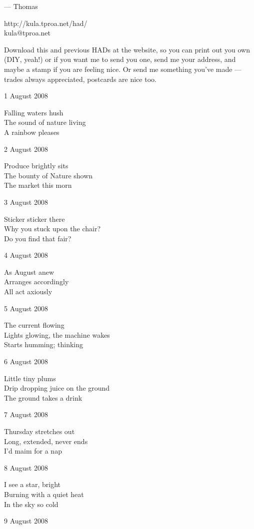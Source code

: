 \documentclass[12pt]{article}
\begin{document}
--- Thomas

http://kula.tproa.net/had/ \\
kula@tproa.net

Download this and previous HADs at the website, so you can
print out you own (DIY, yeah!) or if you want me to send
you one, send me your address, and maybe a stamp if you
are feeling nice. Or send me something you've made ---
trades always appreciated, postcards are nice too.


1 August 2008

Falling waters hush \\
The sound of nature living \\
A rainbow pleases

2 August 2008

Produce brightly sits \\
The bounty of Nature shown \\
The market this morn

\newpage

3 August 2008

Sticker sticker there \\
Why you stuck upon the chair? \\
Do you find that fair?

4 August 2008

As August anew \\
Arranges accordingly \\
All act axiously

5 August 2008

The current flowing \\
Lights glowing, the machine wakes \\
Starts humming; thinking

6 August 2008

Little tiny plums \\
Drip dropping juice on the ground \\
The ground takes a drink

7 August 2008

Thursday stretches out \\
Long, extended, never ends \\
I'd maim for a nap

8 August 2008

I see a star, bright \\
Burning with a quiet heat \\
In the sky so cold

9 August 2008
\end{document}
